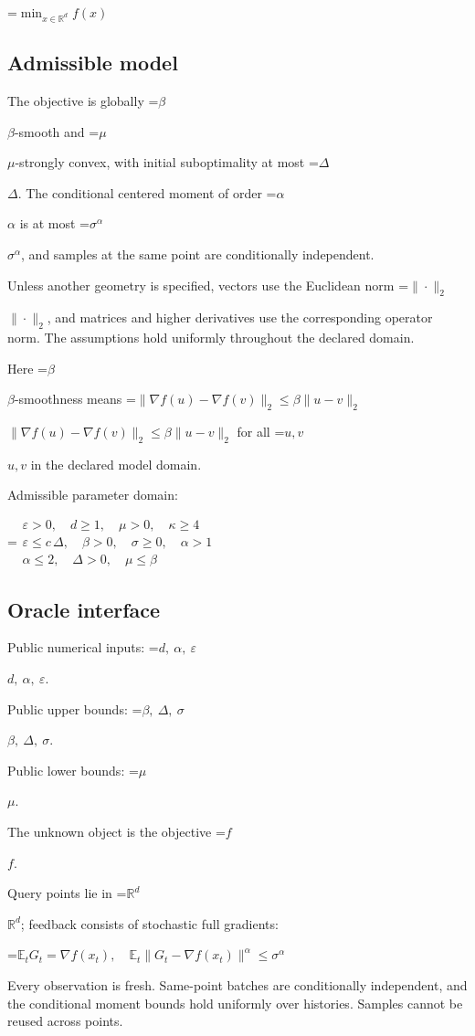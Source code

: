 \documentclass[10pt,a4paper]{article}
\newcommand{\AtlasMath}[1]{\par\begingroup\centering\setbox0=\hbox{$\displaystyle #1$}\ifdim\wd0>1.4\linewidth\typeout{ATLAS WIDE FORMULA: \the\wd0}\fi\ifdim\wd0>\linewidth\resizebox{\linewidth}{!}{\box0}\else\box0\fi\par\endgroup}
\newcommand{\AtlasInlineMath}[1]{\begingroup\setbox0=\hbox{$#1$}\ifdim\wd0>.4\linewidth\endgroup\AtlasMath{#1}\else\endgroup$#1$\fi}
\begin{document}
\AtlasMath{\min_{x\in \mathbb{R}^d}f(x)}


\subsection{Admissible model}
The objective is globally \AtlasInlineMath{\beta}-smooth and \AtlasInlineMath{\mu}-strongly convex, with initial suboptimality at most \AtlasInlineMath{\Delta}. The conditional centered moment of order \AtlasInlineMath{\alpha} is at most \AtlasInlineMath{\sigma^\alpha}, and samples at the same point are conditionally independent.

Unless another geometry is specified, vectors use the Euclidean norm \AtlasInlineMath{\|\cdot\|_2}, and matrices and higher derivatives use the corresponding operator norm. The assumptions hold uniformly throughout the declared domain.

Here \AtlasInlineMath{\beta}-smoothness means \AtlasInlineMath{\|\nabla f(u)-\nabla f(v)\|_2\le\beta\|u-v\|_2} for all \AtlasInlineMath{u,v} in the declared model domain.

Admissible parameter domain:


\AtlasMath{\begin{gathered}\varepsilon > 0,\quad d \ge 1,\quad \mu > 0,\quad \kappa \ge 4\\\varepsilon \le c\,\Delta,\quad \beta > 0,\quad \sigma \ge 0,\quad \alpha > 1\\\alpha \le 2,\quad \Delta > 0,\quad \mu \le \beta\end{gathered}}


\subsection{Oracle interface}
Public numerical inputs: \AtlasInlineMath{d,\ \alpha,\ \varepsilon}.

Public upper bounds: \AtlasInlineMath{\beta,\ \Delta,\ \sigma}.

Public lower bounds: \AtlasInlineMath{\mu}.

The unknown object is the objective \AtlasInlineMath{f}.

Query points lie in \AtlasInlineMath{\mathbb{R}^d}; feedback consists of stochastic full gradients:


\AtlasMath{\mathbb{E}_tG_t=\nabla f(x_t),\quad\mathbb{E}_t\|G_t-\nabla f(x_t)\|^\alpha\le\sigma^\alpha}


Every observation is fresh. Same-point batches are conditionally independent, and the conditional moment bounds hold uniformly over histories. Samples cannot be reused across points.
\end{document}

